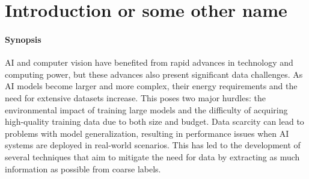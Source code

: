 \graphicspath{{ch1_introduction/}{Figures/}}

\chapter{Introduction or some other name}
\label{chapter:introduction}







\subsubsection{Synopsis}AI and computer vision have benefited from rapid advances in technology and computing power, but these advances also present significant data challenges. As AI models become larger and more complex, their energy requirements and the need for extensive datasets increase. This poses two major hurdles: the environmental impact of training large models and the difficulty of acquiring high-quality training data due to both size and budget. Data scarcity can lead to problems with model generalization, resulting in performance issues when AI systems are deployed in real-world scenarios. This has led to the development of several techniques that aim to mitigate the need for data by extracting as much information as possible from coarse labels.






